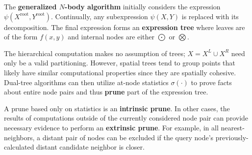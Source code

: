 \documentclass[twoside,leqno,twocolumn]{article}
\newcommand{\union}{\cup}
\newcommand{\summary}{\delta}
\newcommand{\gnp}{\psi}
\newcommand{\defterm}[1]{{\bf #1}}
\newcommand{\kdroot}[1]{#1^{\text{root}}}
\newcommand{\kdleft}[1]{#1^{\!L}}
\newcommand{\kdright}[1]{#1^{\!R}}
\newcommand{\outstat}{\sigma}
\begin{document}
The \defterm{generalized $N$-body algorithm} initially considers the expression $\gnp(\kdroot{X}, \kdroot{Y})$.
Continually, any subexpression $\gnp(X, Y)$ is replaced with its decomposition.
The final expression forms an \defterm{expression tree} where leaves are of the form $f(x,y)$ and internal nodes are either $\bigodot$ or $\bigotimes$.

The hierarchical computation makes no assumption of trees; $X = \kdleft{X} \union \kdright{X}$ need only be a valid partitioning.
However, spatial trees tend to group points that likely have similar computational properties since they are spatially cohesive.
Dual-tree algorithms can then utilize at-node statistics $\outstat(\cdot)$ to prove facts about entire node pairs and thus \defterm{prune} part of the expression tree.

A prune based only on statistics is an \defterm{intrinsic prune}.
In other cases, the results of computations outside of the currently considered node pair can provide necessary evidence to perform an \defterm{extrinsic prune}.
For example, in all nearest-neighbors, a distant pair of nodes can be excluded if the query node's previously-calculated distant candidate neighbor is closer.

\end{document}
